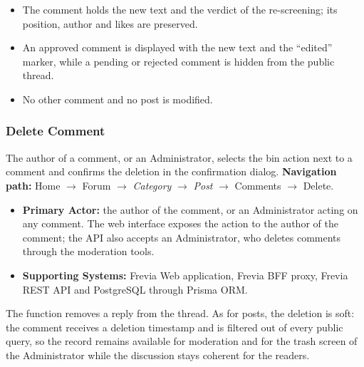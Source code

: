 \begin{itemize}[leftmargin=1.6em,topsep=3pt,itemsep=2pt,parsep=0pt,label=$\bullet$]
      \item The comment holds the new text and the verdict of the re-screening; its
            position, author and likes are preserved.
      \item An approved comment is displayed with the new text and the ``edited'' marker,
            while a pending or rejected comment is hidden from the public thread.
      \item No other comment and no post is modified.
\end{itemize}


\subsubsection{ Delete Comment}

The author of a comment, or an Administrator, selects the bin action next to a comment and
confirms the deletion in the confirmation dialog.\newline
\textbf{Navigation path:} Home $\rightarrow$ Forum $\rightarrow$ \textit{Category} $\rightarrow$
\textit{Post} $\rightarrow$ Comments $\rightarrow$ Delete.


\begin{itemize}[leftmargin=1.6em,topsep=3pt,itemsep=2pt,parsep=0pt,label=$\bullet$]
      \item \textbf{Primary Actor:} the author of the comment, or an Administrator acting on any
            comment. The web interface exposes the action to the author of the comment; the API also
            accepts an Administrator, who deletes comments through the moderation tools.
      \item \textbf{Supporting Systems:} Frevia Web application, Frevia BFF proxy, Frevia REST API
            and PostgreSQL through Prisma ORM.
\end{itemize}

\noindent The function removes a reply from the thread. As for posts, the deletion is soft: the
comment receives a deletion timestamp and is filtered out of every public query, so the record
remains available for moderation and for the trash screen of the Administrator while the
discussion stays coherent for the readers.

